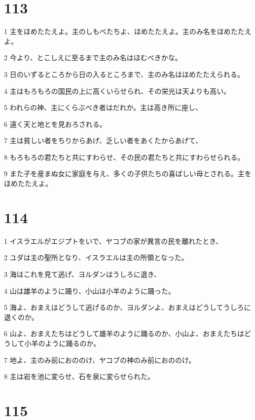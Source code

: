 \chapter{113}

\par 1 主をほめたたえよ。主のしもべたちよ、ほめたたえよ。主のみ名をほめたたえよ。
\par 2 今より、とこしえに至るまで主のみ名はほむべきかな。
\par 3 日のいずるところから日の入るところまで、主のみ名はほめたたえられる。
\par 4 主はもろもろの国民の上に高くいらせられ、その栄光は天よりも高い。
\par 5 われらの神、主にくらぶべき者はだれか。主は高き所に座し、
\par 6 遠く天と地とを見おろされる。
\par 7 主は貧しい者をちりからあげ、乏しい者をあくたからあげて、
\par 8 もろもろの君たちと共にすわらせ、その民の君たちと共にすわらせられる。
\par 9 また子を産まぬ女に家庭を与え、多くの子供たちの喜ばしい母とされる。主をほめたたえよ。

\chapter{114}

\par 1 イスラエルがエジプトをいで、ヤコブの家が異言の民を離れたとき、
\par 2 ユダは主の聖所となり、イスラエルは主の所領となった。
\par 3 海はこれを見て逃げ、ヨルダンはうしろに退き、
\par 4 山は雄羊のように踊り、小山は小羊のように踊った。
\par 5 海よ、おまえはどうして逃げるのか、ヨルダンよ、おまえはどうしてうしろに退くのか。
\par 6 山よ、おまえたちはどうして雄羊のように踊るのか、小山よ、おまえたちはどうして小羊のように踊るのか。
\par 7 地よ、主のみ前におののけ、ヤコブの神のみ前におののけ。
\par 8 主は岩を池に変らせ、石を泉に変らせられた。

\chapter{115}

